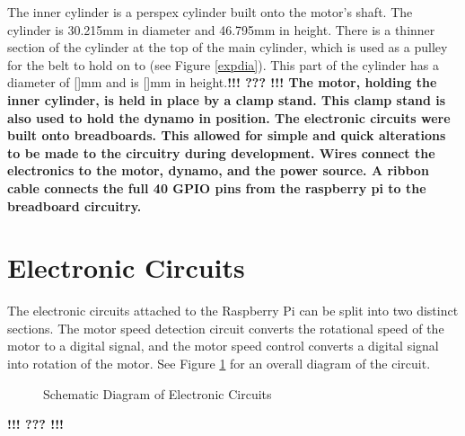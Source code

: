 \documentclass[twoside,a4]{report}
\def\br{\newline \newline \noindent}
\def\cbh{\large\bfseries !!! ??? !!! \normalsize\normalfont}
\begin{document}
	The inner cylinder is a perspex cylinder built onto the motor's shaft. The cylinder is 30.215mm in diameter and 46.795mm in height. There is a thinner section of the cylinder at the top of the main cylinder, which is used as a pulley for the belt to hold on to (see Figure \ref{expdia}). This part of the cylinder has a diameter of []mm and is []mm in height.\cbh \br
	The motor, holding the inner cylinder, is held in place by a clamp stand. This clamp stand is also used to hold the dynamo in position.
	The electronic circuits were built onto breadboards. This allowed for simple and quick alterations to be made to the circuitry during development. Wires connect the electronics to the motor, dynamo, and the power source. A ribbon cable connects the full 40 GPIO pins from the raspberry pi to the breadboard circuitry.
	
	\section{Electronic Circuits} %
	The electronic circuits attached to the Raspberry Pi can be split into two distinct sections. The motor speed detection circuit converts the rotational speed of the motor to a digital signal, and the motor speed control converts a digital signal into rotation of the motor. See Figure \ref{circfull} for an overall diagram of the circuit.
	\begin{figure}[!htb]
		\centering
		\caption{Schematic Diagram of Electronic Circuits}
		\label{circfull}
	\end{figure}
	\cbh %
\end{document}
